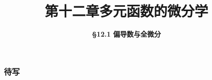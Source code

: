 \everymath{\displaystyle}



\title[第十二章\\
多元微分学]{\texorpdfstring{\LARGE \bfseries 第十二章\quad 多元函数的微分学}{第十二章 多元函数的微分学}} %
\author[\smaller \S 12.1\\
偏导数与全微分] %
{\Large \bfseries \S 12.1 偏导数与全微分}
\date{}





\begin{frame}

\titlepage %

\end{frame}



\begin{frame}
\frametitle{待写}

\end{frame}



